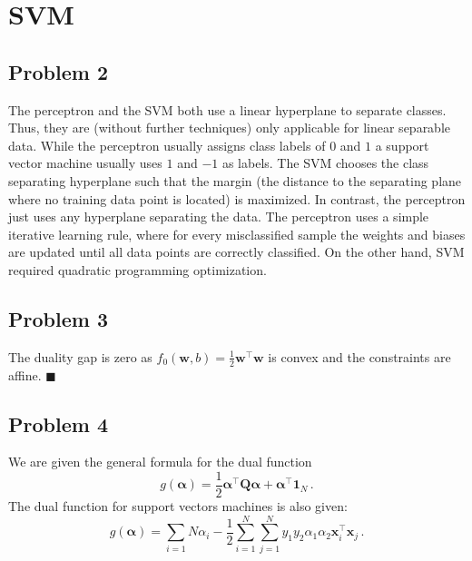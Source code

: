 \documentclass{scrartcl}
\newcommand{\qed}{\hfill $\blacksquare$}
\begin{document}
\section{SVM}
\subsection{Problem 2}
The perceptron and the SVM both use a linear hyperplane to separate classes. Thus, they are (without further techniques) only applicable for linear separable data. While the perceptron usually assigns class labels of $0$ and $1$ a support vector machine usually uses $1$ and $-1$ as labels. The SVM chooses the class separating hyperplane such that the margin (the distance to the separating plane where no training data point is located) is maximized. In contrast, the perceptron just uses any hyperplane separating the data. The perceptron uses a simple iterative learning rule, where for every misclassified sample the weights and biases are updated until all data points are correctly classified.
On the other hand, SVM required quadratic programming optimization.

\subsection{Problem 3}
The duality gap is zero as $f_0 (\mathbf{w}, b) = \frac{1}{2}\mathbf{w}^\top \mathbf{w}$ is convex and the constraints are affine. \qed

\subsection{Problem 4}
We are given the general formula for the dual function 
\begin{equation}
	g(\bm{\alpha}) = \frac{1}{2} \bm{\alpha}^\top \bm{Q} \bm{\alpha} + \bm{\alpha}^\top \bm{1}_N \, .
\end{equation}
The dual function for support vectors machines is also given:
\begin{equation}
	g(\bm{\alpha}) = \sum_{i=1}{N}\alpha_i - \frac{1}{2} \sum_{i=1}^N \sum_{j=1}^N y_1 y_2 \alpha_1 \alpha_2 \mathbf{x}_i^\top \mathbf{x}_j \, .
\end{equation}
\end{document}
